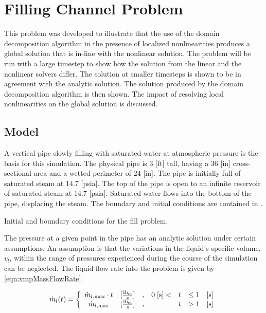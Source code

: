 \section{Filling Channel Problem}
\label{sect:vmp}
This problem was developed to illustrate that the use of the domain decomposition algorithm in the presence of localized nonlinearities produces a global solution that is in-line with the nonlinear solution.
The problem will be run with a large timestep to show how the solution from the linear and the nonlinear solvers differ.
The solution at smaller timesteps is shown to be in agreement with the analytic solution.
The solution produced by the domain decomposition algorithm is then shown.
The impact of resolving local nonlinearities on the global solution is discussed.

\subsection{Model}
\label{subsect:vmpModel}

A vertical pipe slowly filling with saturated water at atmospheric pressure is the basis for this simulation.
The physical pipe is 3 [ft] tall, having a 36 [in] cross-sectional area and a wetted perimeter of 24 [in].
The pipe is initially full of saturated steam at 14.7 [psia].
The top of the pipe is open to an infinite reservoir of saturated steam at 14.7 [psia].
Saturated water flows into the bottom of the pipe, displacing the steam.
The boundary and initial conditions are contained in .

\begin{table}[ht]
\centering
\singlespace

\caption{Initial and boundary conditions for the fill problem.}
\label{tab:vmpBCIC}
\end{table}

The pressure at a given point in the pipe has an analytic solution under certain assumptions.
An assumption is that the variations in the liquid's specific volume, $v_{l}$, within the range of pressures experienced during the course of the simulation can be neglected.
The liquid flow rate into the problem is given by \eqref{eqn:vmpMassFlowRate}.

\begin{equation}
\label{eqn:vmpMassFlowRate}
\dot{m}_{l}(t) = \left\{
\begin{array}{cclrcll}
 \dot{m}_{l,\text{max}}\cdot t & [\frac{ \lbm{} }{\text{s}}] & , & 0\; [\text{s}] < & t & \leq 1 & [\text{s}] \\
 \dot{m}_{l,\text{max}}        & [\frac{ \lbm{} }{\text{s}}] & , &                  & t & > 1    & [\text{s}]
\end{array}\right.
\end{equation}

